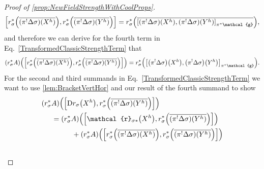 \documentclass[reqno,a4paper,oneside]{amsart}
\theoremstyle{plain}
\theoremstyle{remark}
\theoremstyle{definition}
\def\bas#1\eas{\begin{align*}#1\end{align*}}
\begin{document}
\begin{proof}[Proof of \ref{prop:NewFieldStrengthWithCoolProps}]
\begin{equation*}
\mleft[r_{\sigma}^*\mleft({\overline{ \mleft(\pi^! \Delta \sigma \mright) \mleft(X^h \mright) }}\mright), r_{\sigma}^*\mleft({\overline{ \mleft(\pi^! \Delta \sigma \mright)\mleft(Y^h \mright) }}\mright) \mright]
=
r_\sigma^*\mleft(
{\overline{
	\mleft[ \mleft(\pi^! \Delta \sigma \mright) \mleft(X^h \mright), \mleft(\pi^! \Delta \sigma \mright)\mleft(Y^h \mright) \mright]_{\mathcal{\pi^*\mathcal{g}}}
}}
\mright),
\end{equation*}
and therefore we can derive for the fourth term in Eq.\ \eqref{TransformedClassicStrengthTerm} that
\begin{equation*}
\mleft( r_\sigma^*A \mright)\mleft(
	\mleft[r_{\sigma}^*\mleft({\overline{ \mleft(\pi^! \Delta \sigma \mright) \mleft(X^h \mright) }}\mright), r_{\sigma}^*\mleft({\overline{ \mleft(\pi^! \Delta \sigma \mright)\mleft(Y^h \mright) }}\mright) \mright]
	\mright)
=
r_\sigma^*\mleft(
	\mleft[ \mleft(\pi^! \Delta \sigma \mright) \mleft(X^h \mright), \mleft(\pi^! \Delta \sigma \mright)\mleft(Y^h \mright) \mright]_{\mathcal{\pi^*\mathcal{g}}}
\mright).
\end{equation*}
For the second and third summands in Eq.\ \eqref{TransformedClassicStrengthTerm} we want to use \ref{lem:BracketVertHor} and our result of the fourth summand to show
\begin{align*}
&\mleft( r_\sigma^*A \mright)\mleft(
	\mleft[\mathrm{D}r_\sigma\mleft(X^h\mright), r_{\sigma}^*\mleft({\overline{ \mleft(\pi^! \Delta \sigma \mright) \mleft(Y^h\mright) }}\mright) \mright]
	\mright)
\\ 
&\hspace{0.5cm}
=
\mleft( r_\sigma^*A \mright)\mleft(
	\mleft[\mathcal{r}_{\sigma*}\mleft(X^h\mright), r_{\sigma}^*\mleft({\overline{ \mleft(\pi^! \Delta \sigma \mright) \mleft(Y^h\mright) }}\mright) \mright]
	\mright)
\\&\hspace{1.5cm}
	+ \mleft( r_\sigma^*A \mright)\mleft(\mleft[
	r_{\sigma}^*\mleft({\overline{ \mleft(\pi^! \Delta \sigma \mright) \mleft(X^h\mright) }}\mright), r_{\sigma}^*\mleft({\overline{ \mleft(\pi^! \Delta \sigma \mright) \mleft(Y^h\mright) }}\mright) \mright]
	\mright)
\\ 
&\hspace{0.5cm}

\end{align*}
\end{proof}
\end{document}
